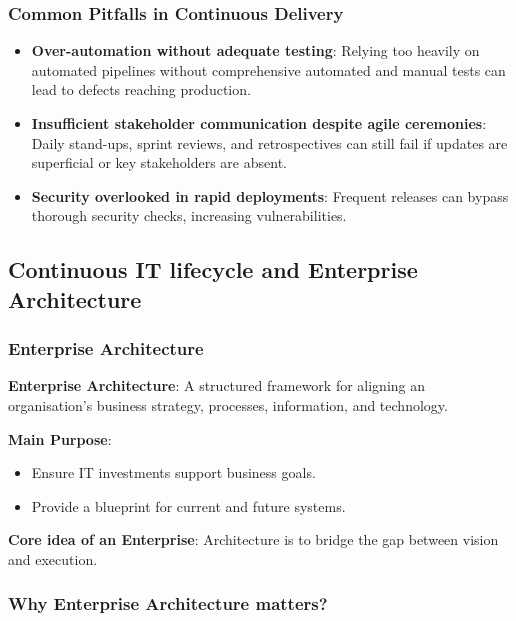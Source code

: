 \subsubsection{Common Pitfalls in Continuous Delivery}

\begin{itemize}
    \item \textbf{Over-automation without adequate testing}: Relying too heavily on automated pipelines without comprehensive automated and manual tests can lead to defects reaching production.
    \item \textbf{Insufficient stakeholder communication despite agile ceremonies}: Daily stand-ups, sprint reviews, and retrospectives can still fail if updates are superficial or key stakeholders are absent.
    \item \textbf{Security overlooked in rapid deployments}: Frequent releases can bypass thorough security checks, increasing vulnerabilities.
\end{itemize}

\subsection{Continuous IT lifecycle and Enterprise Architecture}

\subsubsection{Enterprise Architecture}

\noindent\textbf{Enterprise Architecture}: A structured framework for aligning an organisation’s business strategy, processes, information, and technology.

\bigskip

\noindent\textbf{Main Purpose}:

\begin{itemize}
    \item Ensure IT investments support business goals.
    \item Provide a blueprint for current and future systems.
\end{itemize}

\bigskip

\noindent\textbf{Core idea of an Enterprise}: Architecture is to bridge the gap between vision and execution.

\subsubsection{Why Enterprise Architecture matters?}

